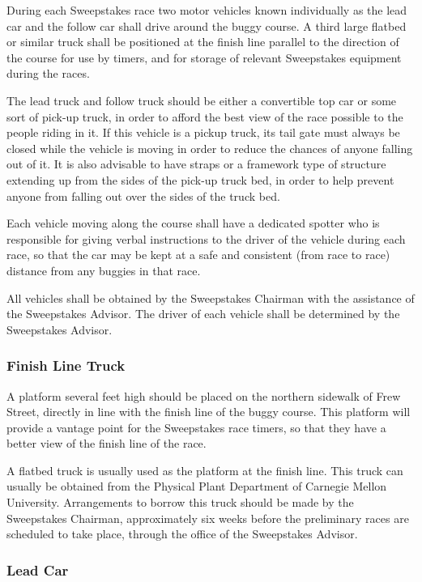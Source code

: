 	During each Sweepstakes race two motor vehicles known individually as the lead car and the follow car shall drive around the buggy course. A third large flatbed or similar truck shall be positioned at the finish line parallel to the direction of the course for use by timers, and for storage of relevant Sweepstakes equipment during the races.

	The lead truck and follow truck should be either a convertible top car or some sort of pick-up truck, in order to afford the best view of the race possible to the people riding in it. If this vehicle is a pickup truck, its tail gate must always be closed while the vehicle is moving in order to reduce the chances of anyone falling out of it. It is also advisable to have straps or a framework type of structure extending up from the sides of the pick-up truck bed, in order to help prevent anyone from falling out over the sides of the truck bed.

	Each vehicle moving along the course shall have a dedicated spotter who is responsible for giving verbal instructions to the driver of the vehicle during each race, so that the car may be kept at a safe and consistent (from race to race) distance from any buggies in that race.

	All vehicles shall be obtained by the Sweepstakes Chairman with the assistance of the Sweepstakes Advisor. The driver of each vehicle shall be determined by the Sweepstakes Advisor.

\subsubsection{Finish Line Truck}

	A platform several feet high should be placed on the northern sidewalk of Frew Street, directly in line with the finish line of the buggy course. This platform will provide a vantage point for the Sweepstakes race timers, so that they have a better view of the finish line of the race.

	A flatbed truck is usually used as the platform at the finish line. This truck can usually be obtained from the Physical Plant Department of Carnegie Mellon University. Arrangements to borrow this truck should be made by the Sweepstakes Chairman, approximately six weeks before the preliminary races are scheduled to take place, through the office of the Sweepstakes Advisor.

\subsubsection{Lead Car}

